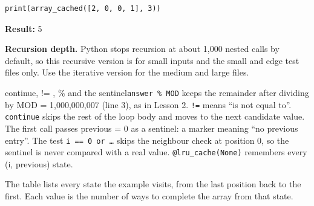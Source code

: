 \documentclass[11pt,a4paper,oneside]{report}
\begin{document}
\begin{lstlisting}
print(array_cached([2, 0, 0, 1], 3))
\end{lstlisting}
\textbf{Result:} 5

\textbf{Recursion depth.} Python stops recursion at about 1,000 nested calls by default, so this recursive version is for small inputs and the small and edge test files only. Use the iterative version for the medium and large files.

\begin{pythonnote}{continue, != , \% and the sentinel}\texttt{answer \% MOD} keeps the remainder after dividing by MOD = 1,000,000,007 (line 3), as in Lesson 2. \texttt{!=} means “is not equal to”. \texttt{continue} skips the rest of the loop body and moves to the next candidate value. The first call passes previous = 0 as a sentinel: a marker meaning “no previous entry”. The test \texttt{i == 0 or …} skips the neighbour check at position 0, so the sentinel is never compared with a real value. \texttt{@lru\_cache(None)} remembers every (i, previous) state.\end{pythonnote}
The table lists every state the example visits, from the last position back to the first. Each value is the number of ways to complete the array from that state.
\end{document}

